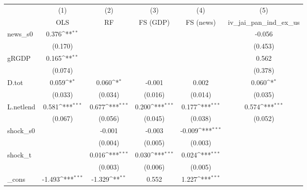 {
\def\sym#1{\ifmmode^{#1}\else\(^{#1}\)\fi}
\begin{tabular}{l*{5}{c}}
\toprule
            &\multicolumn{1}{c}{(1)}&\multicolumn{1}{c}{(2)}&\multicolumn{1}{c}{(3)}&\multicolumn{1}{c}{(4)}&\multicolumn{1}{c}{(5)}\\
            &\multicolumn{1}{c}{OLS}&\multicolumn{1}{c}{RF}&\multicolumn{1}{c}{FS (GDP)}&\multicolumn{1}{c}{FS (news)}&\multicolumn{1}{c}{iv\_jai\_pan\_ind\_ex\_us}\\
\midrule
news\_s0     &       0.376\sym{**} &                     &                     &                     &      -0.056         \\
            &     (0.170)         &                     &                     &                     &     (0.453)         \\
\addlinespace
gRGDP       &       0.165\sym{**} &                     &                     &                     &       0.562         \\
            &     (0.074)         &                     &                     &                     &     (0.378)         \\
\addlinespace
D.tot       &       0.059\sym{*}  &       0.060\sym{*}  &      -0.001         &       0.002         &       0.060\sym{*}  \\
            &     (0.033)         &     (0.034)         &     (0.016)         &     (0.014)         &     (0.035)         \\
\addlinespace
L.netlend   &       0.581\sym{***}&       0.677\sym{***}&       0.200\sym{***}&       0.177\sym{***}&       0.574\sym{***}\\
            &     (0.067)         &     (0.056)         &     (0.045)         &     (0.038)         &     (0.052)         \\
\addlinespace
shock\_s0    &                     &      -0.001         &      -0.003         &      -0.009\sym{***}&                     \\
            &                     &     (0.004)         &     (0.005)         &     (0.003)         &                     \\
\addlinespace
shock\_t     &                     &       0.016\sym{***}&       0.030\sym{***}&       0.024\sym{***}&                     \\
            &                     &     (0.003)         &     (0.006)         &     (0.005)         &                     \\
\addlinespace
\_cons      &      -1.493\sym{***}&      -1.329\sym{**} &       0.552         &       1.227\sym{***}&                     \\

\end{tabular}}
